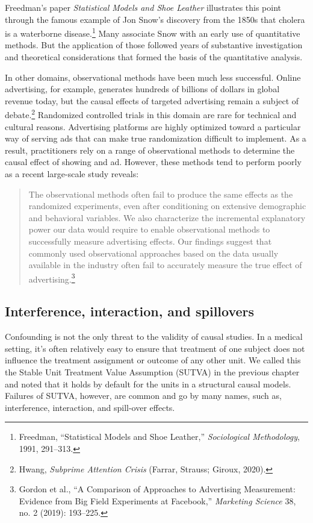 \documentclass{tufte-book}
\begin{document}
Freedman's paper \emph{Statistical Models and Shoe Leather} illustrates
this point through the famous example of Jon Snow's discovery from the
1850s that cholera is a waterborne disease.\footnote{Freedman,
  {``Statistical Models and Shoe Leather,''} \emph{Sociological
  Methodology}, 1991, 291--313.} Many associate Snow with an early use
of quantitative methods. But the application of those followed years of
substantive investigation and theoretical considerations that formed the
basis of the quantitative analysis.

In other domains, observational methods have been much less successful.
Online advertising, for example, generates hundreds of billions of
dollars in global revenue today, but the causal effects of targeted
advertising remain a subject of debate.\footnote{Hwang, \emph{Subprime
  Attention Crisis} (Farrar, Strauss; Giroux, 2020).} Randomized
controlled trials in this domain are rare for technical and cultural
reasons. Advertising platforms are highly optimized toward a particular
way of serving ads that can make true randomization difficult to
implement. As a result, practitioners rely on a range of observational
methods to determine the causal effect of showing and ad. However, these
methods tend to perform poorly as a recent large-scale study reveals:

\begin{quote}
The observational methods often fail to produce the same effects as the
randomized experiments, even after conditioning on extensive demographic
and behavioral variables. We also characterize the incremental
explanatory power our data would require to enable observational methods
to successfully measure advertising effects. Our findings suggest that
commonly used observational approaches based on the data usually
available in the industry often fail to accurately measure the true
effect of advertising.\footnote{Gordon et al., {``A Comparison of
  Approaches to Advertising Measurement: Evidence from Big Field
  Experiments at Facebook,''} \emph{Marketing Science} 38, no. 2 (2019):
  193--225.}
\end{quote}

\hypertarget{interference-interaction-and-spillovers}{%
\subsection{Interference, interaction, and
spillovers}\label{interference-interaction-and-spillovers}}

Confounding is not the only threat to the validity of causal studies. In
a medical setting, it's often relatively easy to ensure that treatment
of one subject does not influence the treatment assignment or outcome of
any other unit. We called this the Stable Unit Treatment Value
Assumption (SUTVA) in the previous chapter and noted that it holds by
default for the units in a structural causal models. Failures of SUTVA,
however, are common and go by many names, such as, interference,
interaction, and spill-over effects.
\end{document}
